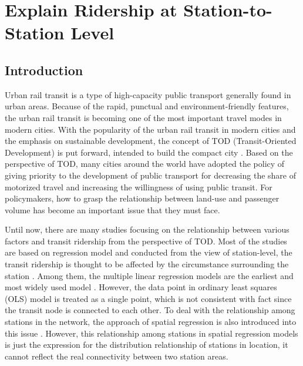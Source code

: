\chapter{Explain Ridership at Station-to-Station Level}
%
\section{Introduction}
%
Urban rail transit is a type of high-capacity public transport generally found in urban areas. Because of the rapid, punctual and environment-friendly features, the urban rail transit is becoming one of the most important travel modes in modern cities. With the popularity of the urban rail transit in modern cities and the emphasis on sustainable development, the concept of TOD (Transit-Oriented Development) is put forward, intended to build the compact city \cite{calthorpe1993next}. Based on the perspective of TOD, many cities around the world have adopted the policy of giving priority to the development of public transport for decreasing the share of motorized travel and increasing the willingness of using public transit. For policymakers, how to grasp the relationship between land-use and passenger volume has become an important issue that they must face.

%
Until now, there are many studies focusing on the relationship between various factors and transit ridership from the perspective of TOD. Most of the studies are based on regression model and conducted from the view of station-level, the transit ridership is thought to be affected by the circumstance surrounding the station \cite{cervero1997travel,taylor2003analyzing,zhao2005transit,estupinan2008relationship,taylor2009nature,sohn2010factors,gutierrez2011transit,jun2015land}. Among them, the multiple linear regression models are the earliest and most widely used model \cite{cervero1997travel,gutierrez2011transit}. However, the data point in ordinary least squares (OLS) model is treated as a single point, which is not consistent with fact since the transit node is connected to each other. To deal with the relationship among stations in the network, the approach of spatial regression is also introduced into this issue \cite{cardozo2012application,jun2015land}. However, this relationship among stations in spatial regression models is just the expression for the distribution relationship of stations in location, it cannot reflect the real connectivity between two station areas.

